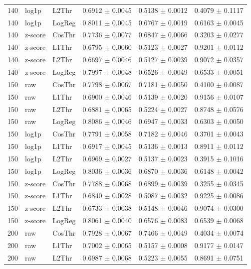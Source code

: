 \begin{longtable}{rllccc}
140 & log1p & L2Thr & 0.6912 $\pm$ 0.0045 & 0.5138 $\pm$ 0.0012 & 0.4079 $\pm$ 0.1117 \\
140 & log1p & LogReg & 0.8011 $\pm$ 0.0045 & 0.6767 $\pm$ 0.0019 & 0.6163 $\pm$ 0.0045 \\
140 & z-score & CosThr & 0.7736 $\pm$ 0.0077 & 0.6847 $\pm$ 0.0066 & 0.3203 $\pm$ 0.0277 \\
140 & z-score & L1Thr & 0.6795 $\pm$ 0.0060 & 0.5123 $\pm$ 0.0027 & 0.9201 $\pm$ 0.0112 \\
140 & z-score & L2Thr & 0.6697 $\pm$ 0.0046 & 0.5127 $\pm$ 0.0039 & 0.9072 $\pm$ 0.0357 \\
140 & z-score & LogReg & 0.7997 $\pm$ 0.0048 & 0.6526 $\pm$ 0.0049 & 0.6533 $\pm$ 0.0051 \\
150 & raw & CosThr & 0.7798 $\pm$ 0.0067 & 0.7181 $\pm$ 0.0050 & 0.4100 $\pm$ 0.0087 \\
150 & raw & L1Thr & 0.6900 $\pm$ 0.0046 & 0.5139 $\pm$ 0.0020 & 0.9156 $\pm$ 0.0107 \\
150 & raw & L2Thr & 0.6881 $\pm$ 0.0065 & 0.5224 $\pm$ 0.0027 & 0.8748 $\pm$ 0.0576 \\
150 & raw & LogReg & 0.8086 $\pm$ 0.0046 & 0.6947 $\pm$ 0.0033 & 0.6303 $\pm$ 0.0050 \\
150 & log1p & CosThr & 0.7791 $\pm$ 0.0058 & 0.7182 $\pm$ 0.0046 & 0.3701 $\pm$ 0.0043 \\
150 & log1p & L1Thr & 0.6917 $\pm$ 0.0045 & 0.5136 $\pm$ 0.0013 & 0.8911 $\pm$ 0.0112 \\
150 & log1p & L2Thr & 0.6969 $\pm$ 0.0027 & 0.5137 $\pm$ 0.0023 & 0.3915 $\pm$ 0.1016 \\
150 & log1p & LogReg & 0.8036 $\pm$ 0.0036 & 0.6870 $\pm$ 0.0036 & 0.6148 $\pm$ 0.0042 \\
150 & z-score & CosThr & 0.7788 $\pm$ 0.0068 & 0.6899 $\pm$ 0.0039 & 0.3255 $\pm$ 0.0345 \\
150 & z-score & L1Thr & 0.6840 $\pm$ 0.0028 & 0.5087 $\pm$ 0.0032 & 0.9225 $\pm$ 0.0086 \\
150 & z-score & L2Thr & 0.6733 $\pm$ 0.0038 & 0.5148 $\pm$ 0.0046 & 0.9074 $\pm$ 0.0300 \\
150 & z-score & LogReg & 0.8061 $\pm$ 0.0040 & 0.6576 $\pm$ 0.0083 & 0.6539 $\pm$ 0.0068 \\
200 & raw & CosThr & 0.7928 $\pm$ 0.0067 & 0.7466 $\pm$ 0.0049 & 0.4034 $\pm$ 0.0074 \\
200 & raw & L1Thr & 0.7002 $\pm$ 0.0065 & 0.5157 $\pm$ 0.0008 & 0.9177 $\pm$ 0.0147 \\
200 & raw & L2Thr & 0.6987 $\pm$ 0.0068 & 0.5223 $\pm$ 0.0055 & 0.8691 $\pm$ 0.0751 \\

\end{longtable}
